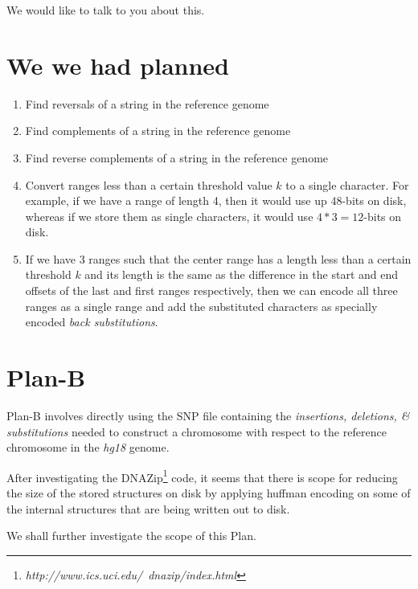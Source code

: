 \documentclass[11pt,twocolumn]{article}
\begin{document}
We would like to talk to you about this.

\section*{We we had planned}

\begin{enumerate}

\item Find reversals of a string in the reference genome

\item Find complements of a string in the reference genome

\item Find reverse complements of a string in the reference genome

\item Convert ranges less than a certain threshold value $k$ to a
  single character. For example, if we have a range of length 4, then
  it would use up 48-bits on disk, whereas if we store them as single
  characters, it would use $4*3 = 12$-bits on disk.

\item If we have 3 ranges such that the center range has a length less
  than a certain threshold $k$ and its length is the same as the
  difference in the start and end offsets of the last and first ranges
  respectively, then we can encode all three ranges as a single range
  and add the substituted characters as specially encoded \textit{back
    substitutions}.

\end{enumerate}

\section*{Plan-B}

Plan-B involves directly using the SNP file containing the
\textit{insertions, deletions, \& substitutions} needed to construct a
chromosome with respect to the reference chromosome in the
\textit{hg18} genome.

After investigating the
DNAZip\footnote{\textit{http://www.ics.uci.edu/~dnazip/index.html}}
code, it seems that there is scope for reducing the size of the stored
structures on disk by applying huffman encoding on some of the
internal structures that are being written out to disk.

We shall further investigate the scope of this Plan.

\clearpage
\end{document}
